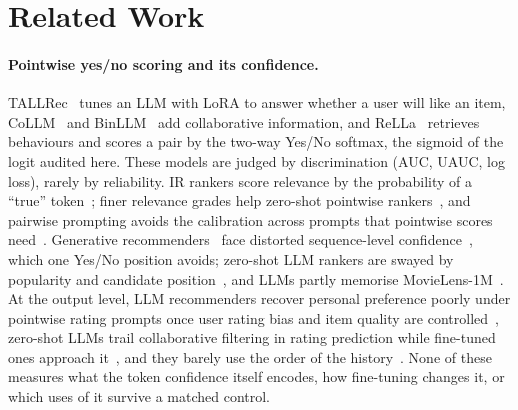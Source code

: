 \section{Related Work}
\label{sec:related}

\paragraph{Pointwise yes/no scoring and its confidence.}
TALLRec~\citep{bao2023tallrec} tunes an LLM with LoRA to answer whether a user will like an item, CoLLM~\citep{zhang2025collm} and
BinLLM~\citep{zhang2024binllm} add collaborative information, and ReLLa~\citep{lin2024rella} retrieves behaviours and scores a pair by the
two-way Yes/No softmax, the sigmoid of the logit audited here. These models are judged by discrimination (AUC, UAUC, log loss), rarely
by reliability. IR rankers score relevance by the probability of a ``true'' token~\citep{nogueira2020document}; finer relevance grades help
zero-shot pointwise rankers~\citep{zhuang2024beyond}, and pairwise prompting avoids the calibration across prompts that pointwise scores
need~\citep{qin2024prp}. Generative recommenders~\citep{geng2022p5,liao2024llara,bao2025bigrec} face distorted sequence-level
confidence~\citep{bao2024d3}, which one Yes/No position avoids; zero-shot LLM rankers are swayed by popularity and candidate
position~\citep{hou2024llmrank}, and LLMs partly memorise MovieLens-1M~\citep{dipalma2025memorize}. At the output level, LLM
recommenders recover personal preference poorly under pointwise rating prompts once user rating bias and item quality are
controlled~\citep{tan2025perrecbench}, zero-shot LLMs trail collaborative filtering in rating prediction while fine-tuned ones approach
it~\citep{kang2023llmrating}, and they barely use the order of the history~\citep{kim2025lostinsequence}. None of these measures what the token
confidence itself encodes, how fine-tuning changes it, or which uses of it survive a matched control.

